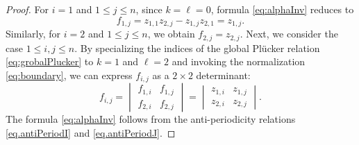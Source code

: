 \documentclass[11pt]{amsart}
\theoremstyle{plain}
\newtheorem{proposition}{Proposition}
\theoremstyle{definition}
\theoremstyle{remark}
\begin{document}
\begin{proof}
For $i=1$ and $1 \leq j \leq n$, since $k=\ell=0$, formula \eqref{eq:alphaInv}
reduces to
\begin{equation}
f_{1,j}=z_{1,1}z_{2,j}-z_{1,j}z_{2,1}=z_{1,j}.
\end{equation}
Similarly, for $i=2$ and $1 \leq j \leq n$, we obtain $f_{2, j}=z_{2, j}$.
Next, we consider the case $1 \leq i, j \leq n$. By specializing the indices of the
global Plücker relation \eqref{eq:grobalPlucker} to $k=1$ and
$\ell=2$ and invoking the normalization \eqref{eq:boundary}, we can express
$f_{i,j}$ as a $2 \times 2$ determinant:
\begin{equation} \label{eq:matrix-representation}
    f_{i,j} = \begin{vmatrix}
    f_{1,i} & f_{1,j} \\
    f_{2,i} & f_{2,j}
    \end{vmatrix}=
    \begin{vmatrix}
    z_{1,i} & z_{1,j} \\
    z_{2,i} & z_{2,j}
    \end{vmatrix}.
\end{equation}
The formula \eqref{eq:alphaInv} follows from the anti-periodicity relations
\eqref{eq.antiPeriodI} and \eqref{eq.antiPeriodJ}.
\end{proof}



\end{document}
